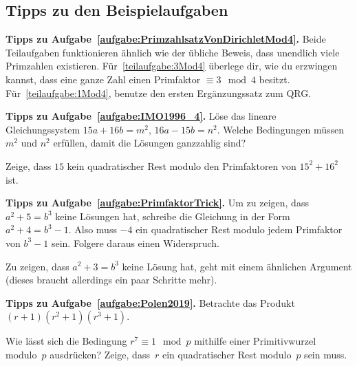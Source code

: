 \subsection*{Tipps zu den Beispielaufgaben}

\textbf{Tipps zu Aufgabe~\ref{aufgabe:PrimzahlsatzVonDirichletMod4}.} Beide Teilaufgaben funktionieren ähnlich wie der übliche Beweis, dass unendlich viele Primzahlen existieren. Für~\ref{teilaufgabe:3Mod4} überlege dir, wie du erzwingen kannst, dass eine ganze Zahl einen Primfaktor $\equiv 3\mod 4$ besitzt. Für~\ref{teilaufgabe:1Mod4}, benutze den ersten Ergänzungssatz zum QRG.



\textbf{Tipps zu Aufgabe~\ref{aufgabe:IMO1996_4}.} Löse das lineare Gleichungssystem $15a+16b=m^2$, $16a-15b=n^2$. Welche Bedingungen müssen $m^2$ und $n^2$ erfüllen, damit die Lösungen ganzzahlig sind?

Zeige, dass $15$ kein quadratischer Rest modulo den Primfaktoren von $15^2+16^2$ ist.

\textbf{Tipps zu Aufgabe~\ref{aufgabe:PrimfaktorTrick}.} Um zu zeigen, dass $a^2+5=b^3$ keine Lösungen hat, schreibe die Gleichung in der Form $a^2+4=b^3-1$. Also muss $-4$ ein quadratischer Rest modulo jedem Primfaktor von $b^3-1$ sein. Folgere daraus einen Widerspruch.

Zu zeigen, dass $a^2+3=b^3$ keine Lösung hat, geht mit einem ähnlichen Argument (dieses braucht allerdings ein paar Schritte mehr).

\textbf{Tipps zu Aufgabe~\ref{aufgabe:Polen2019}.} Betrachte das Produkt $(r+1)(r^2+1)(r^3+1)$.

Wie lässt sich die Bedingung $r^7\equiv 1\mod p$ mithilfe einer Primitivwurzel modulo~$p$ ausdrücken? Zeige, dass~$r$ ein quadratischer Rest modulo~$p$ sein muss.
